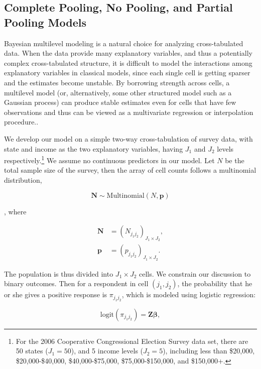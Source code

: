 \documentclass[11pt,article,oneside]{memoir}
\begin{document}
\subsection{Complete Pooling, No Pooling, and Partial Pooling
Models}\label{complete-pooling-no-pooling-and-partial-pooling-models}

Bayesian multilevel modeling is a natural choice for analyzing
cross-tabulated data. When the data provide many explanatory variables,
and thus a potentially complex cross-tabulated structure, it is
difficult to model the interactions among explanatory variables in
classical models, since each single cell is getting sparser and the
estimates become unstable. By borrowing strength across cells, a
multilevel model (or, alternatively, some other structured model such as
a Gaussian process) can produce stable estimates even for cells that
have few observations and thus can be viewed as a multivariate
regression or interpolation procedure..

We develop our model on a simple two-way cross-tabulation of survey
data, with state and income as the two explanatory variables, having
\(J_1\) and \(J_2\) levels
respectively.\footnote{For the 2006 Cooperative Congressional Election Survey
  data set, there are 50 states ($J_1=50$), and 5 income levels ($J_2=5$),
  including less than \$20,000, \$20,000-\$40,000, \$40,000-\$75,000,
  \$75,000-\$150,000, and \$150,000+.} We assume no continuous
predictors in our model. Let \(N\) be the total sample size of the
survey, then the array of cell counts follows a multinomial
distribution,

\begin{equation*}\bm{N}\sim \text{Multinomial}(N, \bm{p})\end{equation*}

, where

\begin{align*}
  \bm{N}&=(N_{j_1j_2})_{J_1\times J_2},\\
  \bm{p}&=(p_{j_1j_2})_{J_1\times J_2}.
\end{align*}

\noindent The population is thus divided into \(J_1\times J_2\) cells.
We constrain our discussion to binary outcomes. Then for a respondent in
cell \((j_1, j_2)\), the probability that he or she gives a positive
response is \(\pi_{j_1j_2}\), which is modeled using logistic
regression:

\begin{equation*}
\text{logit}(\pi_{j_1j_2})=\bm Z\bm\beta,
\end{equation*}
\end{document}
